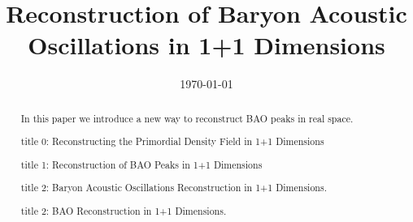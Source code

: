 \documentclass[aps,prd,twocolumn,showpacs,superscriptaddress,groupedaddress,nofootinbib]{revtex4}  %
\begin{document}
\widetext

\title{Reconstruction of Baryon Acoustic Oscillations in 1+1 Dimensions}

%
%
%

\date{\today}

\begin{abstract}
In this paper we introduce a new way to reconstruct BAO peaks in real space.

title 0: Reconstructing the Primordial Density Field in 1+1 Dimensions

title 1: Reconstruction of BAO Peaks in 1+1 Dimensions

title 2: Baryon Acoustic Oscillations Reconstruction in 1+1 Dimensions.

title 2: BAO Reconstruction in 1+1 Dimensions.

\end{abstract}

\pacs{}
\maketitle
\end{document}
